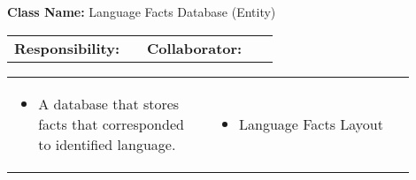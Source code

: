 \begin{cards}[]
    \textbf{Class Name:} Language Facts Database (Entity)
    \tcbline
    \begin{tabular}{p{0.45\linewidth} | p{0.45\linewidth}}
        \textbf{Responsibility:}& 
        \textbf{Collaborator:}\\
    \end{tabular}
    \tcbline
    \begin{tabular}{p{0.45\linewidth} | p{0.45\linewidth}}
        \begin{itemize}
            \item A database that stores facts that corresponded to identified language.
        \end{itemize}
        &
        \begin{itemize}
            \item Language Facts Layout
        \end{itemize}
    \end{tabular}
\end{cards}